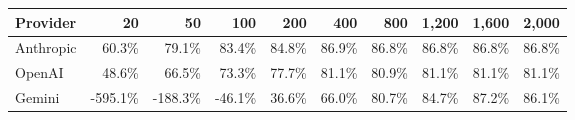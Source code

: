 \begin{tabular}{lrrrrrrrrr}
\toprule
Provider & 20 & 50 & 100 & 200 & 400 & 800 & 1,200 & 1,600 & 2,000 \\
\midrule
Anthropic & 60.3\% & 79.1\% & 83.4\% & 84.8\% & 86.9\% & 86.8\% & 86.8\% & 86.8\% & 86.8\% \\
OpenAI & 48.6\% & 66.5\% & 73.3\% & 77.7\% & 81.1\% & 80.9\% & 81.1\% & 81.1\% & 81.1\% \\
Gemini & -595.1\% & -188.3\% & -46.1\% & 36.6\% & 66.0\% & 80.7\% & 84.7\% & 87.2\% & 86.1\% \\
\bottomrule
\end{tabular}
